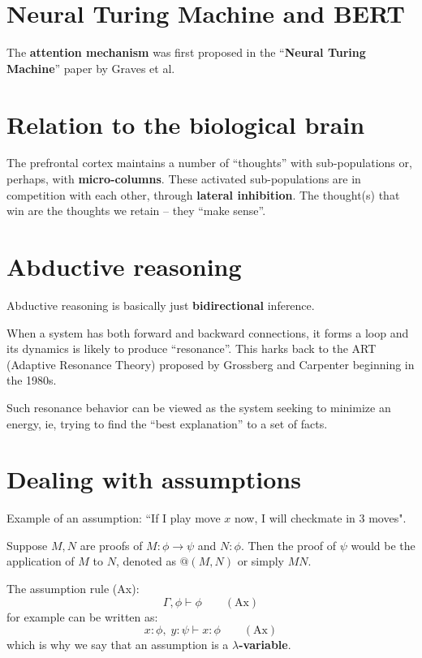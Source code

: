 \section{Neural Turing Machine and BERT}

The \textbf{attention mechanism} was first proposed in the ``\textbf{Neural Turing Machine}'' paper by Graves et al.

\section{Relation to the biological brain}

The prefrontal cortex maintains a number of ``thoughts'' with sub-populations or, perhaps, with \textbf{micro-columns}.  These activated sub-populations are in competition with each other, through \textbf{lateral inhibition}.  The thought(s) that win are the thoughts we retain -- they ``make sense''.

\section{Abductive reasoning}

Abductive reasoning is basically just \textbf{bidirectional} inference.

When a system has both forward and backward connections, it forms a loop and its dynamics is likely to produce ``resonance''.  This harks back to the ART (Adaptive Resonance Theory) proposed by Grossberg and Carpenter beginning in the 1980s.

Such resonance behavior can be viewed as the system seeking to minimize an energy, ie, trying to find the ``best explanation'' to a set of facts.  

\section{Dealing with assumptions}

Example of an assumption:  ``If I play move $x$ now, I will checkmate in 3 moves".

Suppose $M, N$ are proofs of $M: \phi \rightarrow \psi$ and $N: \phi$.  Then the proof of $\psi$ would be the application of $M$ to $N$, denoted as $@(M, N)$ or simply $M N$.

The assumption rule (Ax):
\begin{equation}
\Gamma, \phi \vdash \phi \qquad (\mbox{Ax})
\end{equation}
for example can be written as:
\begin{equation}
x : \phi, \; y : \psi \vdash x : \phi \qquad (\mbox{Ax})
\end{equation}
which is why we say that an assumption is a \textbf{$\lambda$-variable}.  

